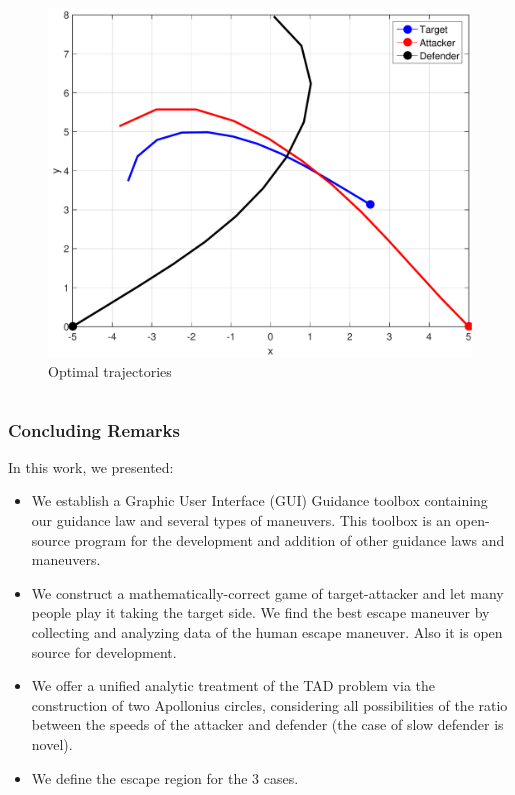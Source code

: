 \documentclass{beamer}
\begin{document}
\begin{frame}
\begin{columns}[c]
	\begin{column}{.3\linewidth}
		\begin{figure}[H]
			\centering
			\includegraphics[scale = 0.2]{fig/fig8_paper_numerical.pdf}
			\caption{Optimal trajectories}
			\label{Optimal trajectories}
		\end{figure}
	\end{column}

\end{columns}

\end{frame}
\begin{frame}
\frametitle{Concluding Remarks}
In this work, we presented:
\begin{itemize}
	\item We establish a Graphic User Interface (GUI) Guidance toolbox containing our guidance law and several types of maneuvers. This toolbox is an open-source program for the development and addition
	of other guidance laws and maneuvers.
	\item We construct a mathematically-correct game of target-attacker and let many people play it taking the target side. We find the best escape maneuver by collecting and analyzing data of the human escape maneuver. Also it is open source for development.
	\item We offer a unified analytic treatment of the TAD problem via the construction of two Apollonius circles, considering all possibilities of the ratio between the speeds of the attacker and defender (the case of slow defender is novel). 
	\item We define the escape region for the 3 cases.
\end{itemize}
\end{frame}
\end{document}
